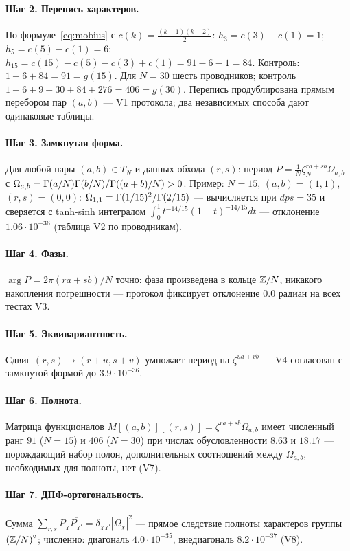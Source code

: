 \paragraph{Шаг 2. Перепись характеров.} По
формуле~\eqref{eq:mobius} с $c(k)=\frac{(k-1)(k-2)}2$:
$h_3=c(3)-c(1)=1$; $h_5=c(5)-c(1)=6$; $h_{15}=c(15)-c(5)-c(3)+c(1)
=91-6-1=84$. Контроль: $1+6+84=91=g(15)$. Для $N=30$ шесть
проводников; контроль $1+6+9+30+84+276=406=g(30)$. Перепись
продублирована прямым перебором пар $(a,b)$ --- V1 протокола;
два независимых способа дают одинаковые таблицы.

\paragraph{Шаг 3. Замкнутая форма.} Для любой пары $(a,b)\in T_N$
и данных обхода $(r,s)$: период
$P=\frac1N\zeta_N^{ra+sb}\Omega_{a,b}$ с
$\Omega_{a,b}=\Gamma(a/N)\Gamma(b/N)/\Gamma((a+b)/N)>0$. Пример:
$N=15$, $(a,b)=(1,1)$, $(r,s)=(0,0)$:
$\Omega_{1,1}=\Gamma(1/15)^2/\Gamma(2/15)$ ---
вычисляется при $dps=35$ и сверяется с tanh-sinh
интегралом $\int_0^1t^{-14/15}(1-t)^{-14/15}dt$ --- отклонение
$1.06\cdot10^{-36}$ (таблица V2 по проводникам).

\paragraph{Шаг 4. Фазы.} $\arg P=2\pi(ra+sb)/N$ точно: фаза
произведена в кольце $\mathbb{Z}/N$, никакого накопления погрешности ---
протокол фиксирует отклонение $0.0$ радиан на всех тестах V3.

\paragraph{Шаг 5. Эквивариантность.} Сдвиг $(r,s)\mapsto(r+u,s+v)$
умножает период на $\zeta^{ua+vb}$ --- V4 согласован с
замкнутой формой до $3.9\cdot10^{-36}$.

\paragraph{Шаг 6. Полнота.} Матрица функционалов
$M[(a,b)][(r,s)]=\zeta^{ra+sb}\Omega_{a,b}$ имеет численный ранг
$91$ ($N=15$) и $406$ ($N=30$) при числах обусловленности
$8.63$ и $18.17$ --- порождающий набор полон, дополнительных
соотношений между $\Omega_{a,b}$, необходимых для полноты, нет
(V7).

\paragraph{Шаг 7. ДПФ-ортогональность.} Сумма
$\sum_{r,s}P_\chi\overline{P_{\chi'}}=\delta_{\chi\chi'}
|\Omega_\chi|^2$ --- прямое следствие полноты характеров группы
$(\mathbb{Z}/N)^2$; численно: диагональ $4.0\cdot10^{-35}$, внедиагональ
$8.2\cdot10^{-37}$ (V8).

